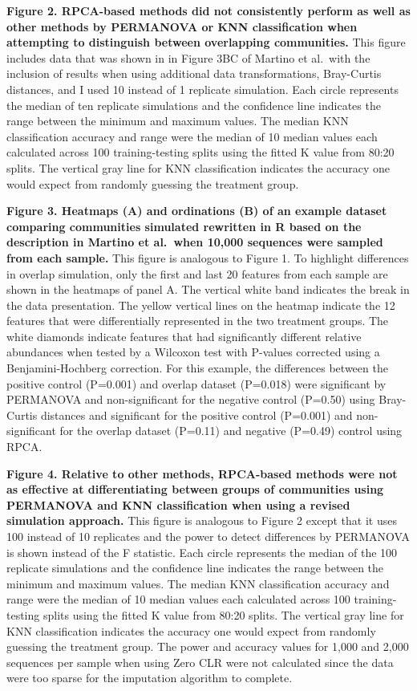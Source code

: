 \documentclass[
  11pt,
]{article}
\begin{document}
\textbf{Figure 2. RPCA-based methods did not consistently perform as
well as other methods by PERMANOVA or KNN classification when attempting
to distinguish between overlapping communities.} This figure includes
data that was shown in in Figure 3BC of Martino et al.~with the
inclusion of results when using additional data transformations,
Bray-Curtis distances, and I used 10 instead of 1 replicate simulation.
Each circle represents the median of ten replicate simulations and the
confidence line indicates the range between the minimum and maximum
values. The median KNN classification accuracy and range were the median
of 10 median values each calculated across 100 training-testing splits
using the fitted K value from 80:20 splits. The vertical gray line for
KNN classification indicates the accuracy one would expect from randomly
guessing the treatment group.

\textbf{Figure 3. Heatmaps (A) and ordinations (B) of an example dataset
comparing communities simulated rewritten in R based on the description
in Martino et al.~when 10,000 sequences were sampled from each sample.}
This figure is analogous to Figure 1. To highlight differences in
overlap simulation, only the first and last 20 features from each sample
are shown in the heatmaps of panel A. The vertical white band indicates
the break in the data presentation. The yellow vertical lines on the
heatmap indicate the 12 features that were differentially represented in
the two treatment groups. The white diamonds indicate features that had
significantly different relative abundances when tested by a Wilcoxon
test with P-values corrected using a Benjamini-Hochberg correction. For
this example, the differences between the positive control (P=0.001) and
overlap dataset (P=0.018) were significant by PERMANOVA and
non-significant for the negative control (P=0.50) using Bray-Curtis
distances and significant for the positive control (P=0.001) and
non-significant for the overlap dataset (P=0.11) and negative (P=0.49)
control using RPCA.

\textbf{Figure 4. Relative to other methods, RPCA-based methods were not
as effective at differentiating between groups of communities using
PERMANOVA and KNN classification when using a revised simulation
approach.} This figure is analogous to Figure 2 except that it uses 100
instead of 10 replicates and the power to detect differences by
PERMANOVA is shown instead of the F statistic. Each circle represents
the median of the 100 replicate simulations and the confidence line
indicates the range between the minimum and maximum values. The median
KNN classification accuracy and range were the median of 10 median
values each calculated across 100 training-testing splits using the
fitted K value from 80:20 splits. The vertical gray line for KNN
classification indicates the accuracy one would expect from randomly
guessing the treatment group. The power and accuracy values for 1,000
and 2,000 sequences per sample when using Zero CLR were not calculated
since the data were too sparse for the imputation algorithm to complete.
\end{document}
